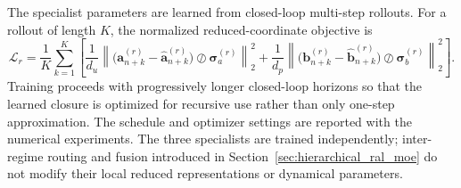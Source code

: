 The specialist parameters are learned from closed-loop multi-step rollouts.
For a rollout of length $K$, the normalized reduced-coordinate objective is
\begin{equation}
  \mathcal{L}_{r}
  =
  \frac{1}{K}\sum_{k=1}^{K}
  \left[
    \frac{1}{d_u}
    \left\|
      \bigl(
        \boldsymbol{a}^{(r)}_{n+k}
        -\widehat{\boldsymbol{a}}^{(r)}_{n+k}
      \bigr)
      \oslash\boldsymbol{\sigma}^{(r)}_a
    \right\|_2^2
    +
    \frac{1}{d_p}
    \left\|
      \bigl(
        \boldsymbol{b}^{(r)}_{n+k}
        -\widehat{\boldsymbol{b}}^{(r)}_{n+k}
      \bigr)
      \oslash\boldsymbol{\sigma}^{(r)}_b
    \right\|_2^2
  \right].
  \label{eq:unified_rollout_loss}
\end{equation}
Training proceeds with progressively longer closed-loop horizons so that the
learned closure is optimized for recursive use rather than only one-step
approximation.  The schedule and optimizer settings are reported with the
numerical experiments.  The three specialists are trained independently;
inter-regime routing and fusion introduced in Section~\ref{sec:hierarchical_ral_moe}
do not modify their local reduced representations or dynamical parameters.
